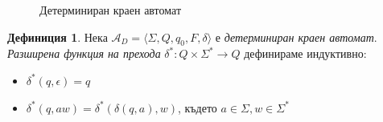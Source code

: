 \documentclass[12pt, oneside]{article}
\theoremstyle{definition}
\newtheorem{definition}{Дефиниция}[section]
\begin{document}
\begin{figure}[!htb]
	\centering
	
	\caption{Детерминиран краен автомат}
\end{figure}

\begin{definition}
	Нека \( \mathcal{A}_D = \langle \Sigma, Q, q_0, F, \delta \rangle \) е \emph{детерминиран краен автомат}. \emph{Разширена функция на прехода} \( \delta^*: Q \times \Sigma^* \to Q \) дефинираме индуктивно:

	\begin{itemize}
		\item \( \delta^*(q, \epsilon) = q \)
		\item \( \delta^*(q, aw) = \delta^*(\delta(q, a), w) \), където \( a \in \Sigma, w \in \Sigma^* \)
	\end{itemize}
\end{definition}
\end{document}
